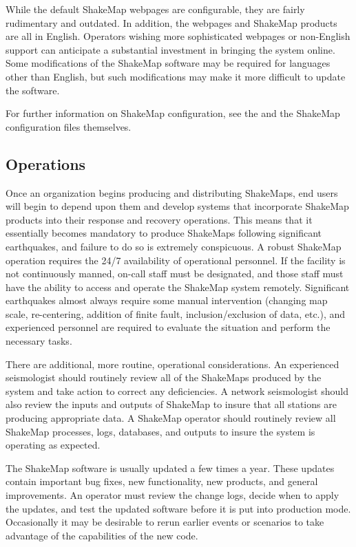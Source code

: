 \documentclass[letterpaper,10pt,english]{sphinxmanual}
\begin{document}
While the default ShakeMap webpages are configurable, they are fairly rudimentary and
outdated. In addition, the webpages and ShakeMap products are all in English. Operators
wishing more sophisticated webpages or non-English support can anticipate a substantial
investment in bringing the system online. Some modifications of the ShakeMap software
may be required for languages other than English, but such modifications may make it
more difficult to update the software.

For further information on ShakeMap configuration, see the {\hyperref[software_guide:sm35\string-software\string-guide]{}} and the
ShakeMap configuration files themselves.


\subsection{Operations}
\label{software_guide:operations}
Once an organization begins producing and distributing ShakeMaps, end users will begin
to depend upon them and develop systems that incorporate ShakeMap products into their
response and recovery operations. This means that it essentially becomes mandatory to
produce ShakeMaps following significant earthquakes, and failure to do so is
extremely conspicuous. A robust ShakeMap operation requires the 24/7 availability of
operational personnel. If the facility is not continuously manned, on-call staff must be
designated, and those staff must have the ability to access and operate the ShakeMap
system remotely. Significant earthquakes almost always require some manual
intervention (changing map scale, re-centering, addition of finite fault,
inclusion/exclusion of data, etc.), and experienced personnel are required to evaluate the
situation and perform the necessary tasks.

There are additional, more routine, operational considerations. An experienced
seismologist should routinely review all of the ShakeMaps produced by the system and
take action to correct any deficiencies. A network seismologist should also review the
inputs and outputs of ShakeMap to insure that all stations are producing appropriate data.
A ShakeMap operator should routinely review all ShakeMap processes, logs, databases,
and outputs to insure the system is operating as expected.

The ShakeMap software is usually updated a few times a year. These updates contain
important bug fixes, new functionality, new products, and general improvements. An
operator must review the change logs, decide when to apply the updates, and test the
updated software before it is put into production mode. Occasionally it may be desirable
to rerun earlier events or scenarios to take advantage of the capabilities of the new code.
\end{document}
